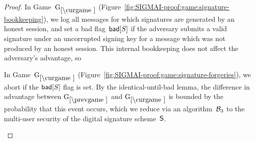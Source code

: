 \begin{proof}

In Game~$\curGm$ (Figure~\ref{fig:SIGMAI-proof:game:signature-bookkeeping}), we log all messages for which signatures are generated by an honest session,
and set a bad flag~$\mathsf{bad}[S]$ if the adversary submits a valid signature under an uncorrupted signing key for a message which was not produced by an honest session.
This internal bookkeeping does not affect the adversary's advantage, so



In Game~$\curGm$ (Figure~\ref{fig:SIGMAI-proof:game:signature-forgeries}), we abort if the $\mathsf{bad}[S]$ flag is set.
By the identical-until-bad lemma, the difference in advantage between $\prevGm$ and $\curGm$ is bounded by the probability that this event occurs,
which we reduce via an algorithm~$\mathcal{B}_3$ to the multi-user security of the digital signature scheme~$\mathsf{S}$.%


\begin{collectinmacro}{\SIGMIProofSignatureMAC}{}{} %
\begin{figure}[tp]
	\begin{minipage}[t]{0.49\textwidth}


\end{minipage}
\end{figure}
\end{collectinmacro}
\end{proof}
